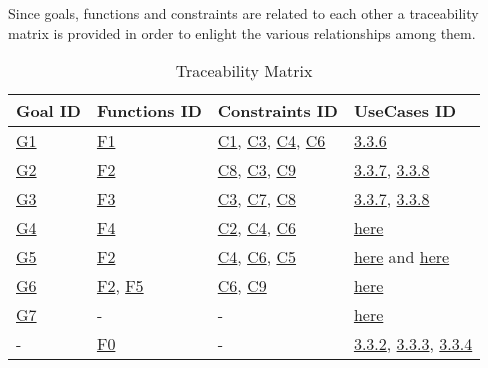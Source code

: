 Since goals, functions and constraints are related to each other a traceability matrix is provided in order to enlight the various relationships among them.
\begin{flushleft}

\begin{table}[htp]
\centering
\begin{tabular}{|l|l|l|l|}
\hline
Goal ID&Functions ID&Constraints ID&UseCases ID\\
\hline
\hyperlink{G1}{G1}&\hyperlink{sec:f1}{F1}&\hyperlink{C1}{C1}, \hyperlink{C3}{C3}, \hyperlink{C4}{C4}, \hyperlink{C6}{C6}&\hyperlink{tab:reportcreationtab}{3.3.6}\\
\hline
\hyperlink{G2}{G2}&\hyperlink{sec:f2}{F2}&\hyperlink{C8}{C8}, \hyperlink{C3}{C3}, \hyperlink{C9}{C9}&\hyperlink{tab:dataminingtab}{3.3.7}, \hyperlink{tab:dataminingofficertab}{3.3.8}\\
\hline
\hyperlink{G3}{G3}&\hyperlink{sec:f3}{F3}&\hyperlink{C3}{C3}, \hyperlink{C7}{C7}, \hyperlink{C8}{C8}&\hyperlink{tab:dataminingtab}{3.3.7}, \hyperlink{tab:dataminingofficertab}{3.3.8}\\
\hline
\hyperlink{G4}{G4}&\hyperlink{sec:f4}{F4}&\hyperlink{C2}{C2}, \hyperlink{C4}{C4}, \hyperlink{C6}{C6}&\hyperlink{tab:AutomaticTrafficTicket}{here}\\
\hline
\hyperlink{G5}{G5}&\hyperlink{sec:f2}{F2}&\hyperlink{C4}{C4}, \hyperlink{C6}{C6}, \hyperlink{C5}{C5}&\hyperlink{tab:dataminingvehicleofficerstab}{here} and \hyperlink{tab:dataminingvehicletab}{here}\\
\hline
\hyperlink{G6}{G6}&\hyperlink{sec:f2}{F2}, \hyperlink{sec:f5}{F5}&\hyperlink{C6}{C6}, \hyperlink{C9}{C9}&\hyperlink{tab:statisticsconsultingtab}{here}\\
\hline
\hyperlink{G7}{G7}&-&-&\hyperlink{tab:statisticsconsultingtab}{here}\\
\hline
-&\hyperlink{sec:f0}{F0}&-&\hyperlink{tab:signupusecase}{3.3.2}, \hyperlink{tab:loginusecase}{3.3.3}, \hyperlink{tab:recoverpasswordusecase}{3.3.4}\\
\hline

\end{tabular}

\caption{Traceability Matrix} 

\end{table}

\end{flushleft}